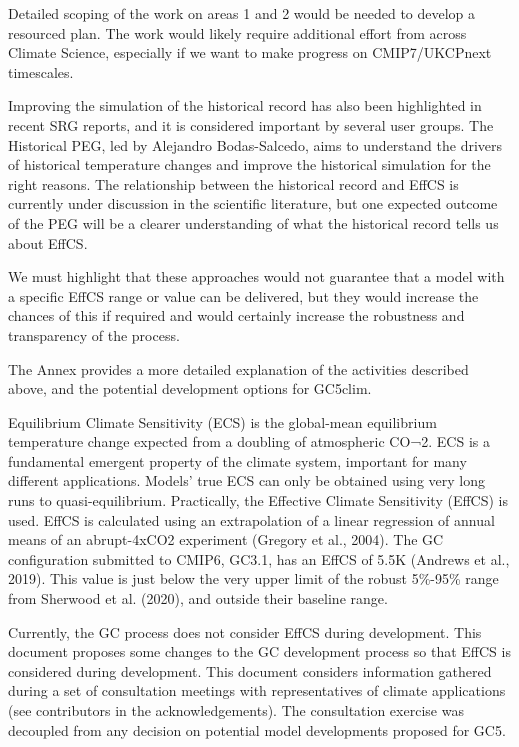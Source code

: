 \documentclass[gmd, manuscript]{copernicus}
\begin{document}
Detailed scoping of the work on areas 1 and 2 would be needed to develop a resourced plan.
The work would likely require additional effort from across Climate Science, especially if we want to make progress on CMIP7/UKCPnext timescales. 

Improving the simulation of the historical record has also been highlighted in recent SRG reports, and it is considered important by several user groups.
The Historical PEG, led by Alejandro Bodas-Salcedo, aims to understand the drivers of historical temperature changes and improve the historical simulation for the right reasons.
The relationship between the historical record and EffCS is currently under discussion in the scientific literature, but one expected outcome of the PEG will be a clearer understanding of what the historical record tells us about EffCS.

We must highlight that these approaches would not guarantee that a model with a specific EffCS range or value can be delivered, but they would increase the chances of this if required and would certainly increase the robustness and transparency of the process.  

The Annex provides a more detailed explanation of the activities described above, and the potential development options for GC5clim.

Equilibrium Climate Sensitivity (ECS) is the global-mean equilibrium temperature change expected from a doubling of atmospheric CO¬2.
ECS is a fundamental emergent property of the climate system, important for many different applications.
Models’ true ECS can only be obtained using very long runs to quasi-equilibrium.
Practically, the Effective Climate Sensitivity (EffCS) is used.
EffCS is calculated using an extrapolation of a linear regression of annual means of an abrupt-4xCO2 experiment (Gregory et al., 2004).
The GC configuration submitted to CMIP6, GC3.1, has an EffCS of 5.5K (Andrews et al., 2019). This value is just below the very upper limit of the robust 5\%-95\% range from Sherwood et al. (2020), and outside their baseline range.

Currently, the GC process does not consider EffCS during development.
This document proposes some changes to the GC development process so that EffCS is considered during development.
This document considers information gathered during a set of consultation meetings with representatives of climate applications (see contributors in the acknowledgements).
The consultation exercise was decoupled from any decision on potential model developments proposed for GC5.
\end{document}
